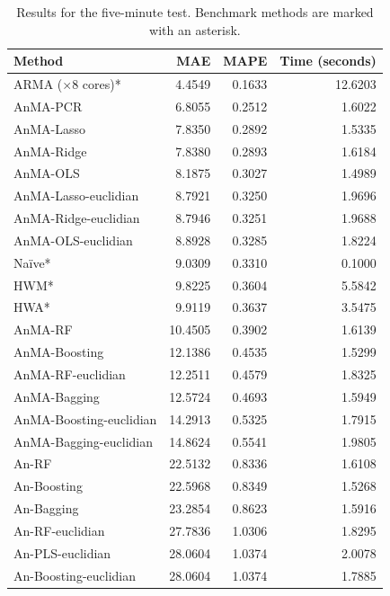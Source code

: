 \documentclass[journal, twoside]{IEEEtran}
\begin{document}
\begin{table}
\centering
\caption{Results for the five-minute test. Benchmark methods are marked with an asterisk.}
\label{tab:table_results_5_min}
\footnotesize
\begin{tabular}{lrrr}
\hline
 Method &      MAE &   MAPE &       Time (seconds) \\
\hline
ARMA ($\times 8$ cores)* &   4.4549 & 0.1633 & 12.6203 \\
                AnMA-PCR &   6.8055 & 0.2512 &  1.6022 \\
              AnMA-Lasso &   7.8350 & 0.2892 &  1.5335 \\
              AnMA-Ridge &   7.8380 & 0.2893 &  1.6184 \\
                AnMA-OLS &   8.1875 & 0.3027 &  1.4989 \\
          AnMA-Lasso-euclidian &   8.7921 & 0.3250 &  1.9696 \\
          AnMA-Ridge-euclidian &   8.7946 & 0.3251 &  1.9688 \\
           AnMA-OLS-euclidian  &   8.8928 & 0.3285 &  1.8224 \\
                  Naïve* &   9.0309 & 0.3310 &  0.1000 \\
                    HWM* &   9.8225 & 0.3604 &  5.5842 \\
                    HWA* &   9.9119 & 0.3637 &  3.5475 \\
                 AnMA-RF &  10.4505 & 0.3902 &  1.6139 \\
              AnMA-Boosting &  12.1386 & 0.4535 &  1.5299 \\
             AnMA-RF-euclidian &  12.2511 & 0.4579 &  1.8325 \\
               AnMA-Bagging &  12.5724 & 0.4693 &  1.5949 \\
          AnMA-Boosting-euclidian &  14.2913 & 0.5325 &  1.7915 \\
           AnMA-Bagging-euclidian &  14.8624 & 0.5541 &  1.9805 \\
                   An-RF &  22.5132 & 0.8336 &  1.6108 \\
                An-Boosting &  22.5968 & 0.8349 &  1.5268 \\
                 An-Bagging &  23.2854 & 0.8623 &  1.5916 \\
               An-RF-euclidian &  27.7836 & 1.0306 &  1.8295 \\
              An-PLS-euclidian &  28.0604 & 1.0374 &  2.0078 \\
            An-Boosting-euclidian &  28.0604 & 1.0374 &  1.7885 \\

\end{tabular}
\end{table}
\end{document}
